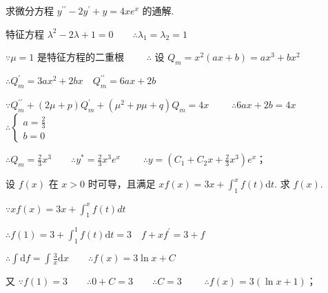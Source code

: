 \begin{problem}[points = 7]
求微分方程 $y^{\prime\prime} - 2y^{\prime} + y = 4xe^x$ 的通解.
\end{problem}
\begin{solution}
    特征方程 $\lambda^2 - 2\lambda + 1 = 0 \qquad \therefore \lambda_1 = \lambda_2 = 1$

    $\because \mu = 1$ 是特征方程的二重根 $\qquad \therefore$ 设 $Q_m = x^2(ax + b) = ax^3 + bx^2$

    $\therefore Q_m^{\prime} = 3ax^2 + 2bx \quad Q_m^{\prime\prime} = 6ax + 2b$

    $\because Q_m^{\prime\prime} + (2\mu + p)Q_m^{\prime} + (\mu^2 + p\mu + q)Q_m = 4x \qquad$
    $\therefore 6ax + 2b = 4x \qquad$
    $\therefore \begin{cases}
            a = \frac{2}{3} \\
            b = 0
        \end{cases}$

    $\therefore Q_m = \frac{2}{3}x^3 \qquad \therefore y^* = \frac{2}{3}x^3e^x \qquad$
    $\therefore y = \left(C_1 + C_2x + \frac{2}{3}x^3\right)e^x$；
\end{solution}

\begin{problem}[points = 7]
设 $f(x)$ 在 $x > 0$ 时可导，且满足 $xf(x) = 3x + \int_1^x f(t)\mathrm{d}t$. 求 $f(x)$.
\end{problem}
\begin{solution}
    $\because xf(x) = 3x + \int_1^x f(t)dt$

    $\therefore f(1) = 3 + \int_1^1 f(t)\mathrm{d}t = 3 \quad f + xf^{\prime} = 3 + f$

    $\therefore \int \mathrm{d}f = \int \frac{3}{x}\mathrm{d}x \qquad \therefore f(x) = 3\ln{x} + C$

    又 $\because f(1) = 3 \qquad \therefore 0 + C = 3 \qquad \therefore C = 3 \qquad$
    $\therefore f(x) = 3(\ln{x} + 1)$；
\end{solution}

